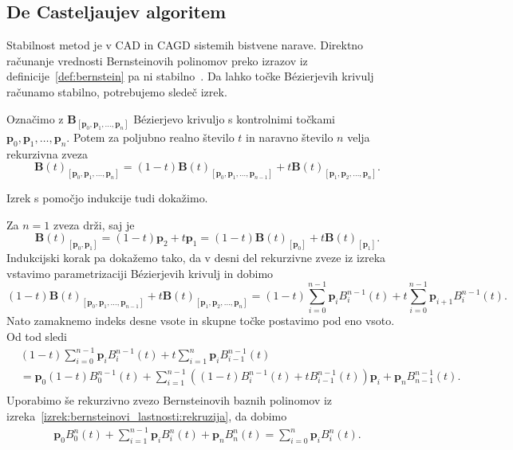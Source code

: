 \documentclass[isrm2, tisk]{fmfdelo}
\newcommand{\p}{\mathbf{p}}
\newcommand{\lilb}[2]{B_{#1}^{#2}(t)}
\newcommand{\bigbbt}{\textbf{B}(t)}
\newcommand{\bernsteinsump}[2]{\sum_{#1=0}^{#2} \p_{#1}\lilb{#1}{#2}}
\begin{document}
    \subsection{De Casteljaujev algoritem}
    Stabilnost metod je v CAD in CAGD sistemih bistvene narave.
    Direktno računanje vrednosti Bernsteinovih polinomov preko izrazov iz definicije~\ref{def:bernstein} pa ni stabilno~\cite{placeholder}.
    Da lahko točke Bézierjevih krivulj računamo stabilno, potrebujemo sledeč izrek.
    \begin{izrek}
        \label{izrek:decastelaju-rekurzija}
        Označimo z $\mathbf{B}_{[\p_0,\p_1,\dots,\p_n]}$ Bézierjevo krivuljo s kontrolnimi točkami \\
        $\p_0,\p_1,\dots,\p_n$.
        Potem za poljubno realno število $t$ in naravno število $n$ velja rekurzivna zveza \[\bigbbt_{[\p_0,\p_1,\dots,\p_n]} = (1-t)\bigbbt_{[\p_0,\p_1,\dots,\p_{n-1}]} +t\bigbbt_{[\p_1,\p_2,\dots,\p_n]}.\]
    \end{izrek}
    \noindent Izrek s pomočjo indukcije tudi dokažimo.
    \begin{dokaz}
        Za $n=1$ zveza drži, saj je  \[\bigbbt_{[\p_0,\p_1]} = (1-t)\p_2 +t\p_1 = (1-t)\bigbbt_{[\p_0]} +t\bigbbt_{[\p_1]}.\]
        Indukcijski korak pa dokažemo tako, da v desni del rekurzivne zveze iz izreka vstavimo parametrizaciji Bézierjevih krivulj in dobimo
        \[ (1-t) \bigbbt_{[\p_0,\p_1,\dots,\p_{n-1}]}+t\bigbbt_{[\p_1,\p_2,\dots,\p_n]} = (1-t)\bernsteinsump{i}{n-1}+t\sum_{i=0}^{n-1} \p_{i+1}B_i^{n-1}(t).\]
        Nato zamaknemo indeks desne vsote in skupne točke postavimo pod eno vsoto.
        Od tod sledi
        \begin{align*}
            &(1-t)\bernsteinsump{i}{n-1}+ t\sum_{i=1}^{n} \p_{i}B_{i-1}^{n-1}(t) \\
            &= \p_0(1-t)B_{0}^{n-1}(t) + \sum_{i=1}^{n-1}\left((1-t)B_i^{n-1}(t) + tB_{i-1}^{n-1}(t)\right)\p_{i} + \p_n B_{n-1}^{n-1}(t). \\
        \end{align*}
        Uporabimo še rekurzivno zvezo Bernsteinovih baznih polinomov iz izreka~\ref{izrek:bernsteinovi_lastnosti:rekruzija}, da dobimo
        \begin{align*}
            \p_0B_{0}^{n}(t) + \sum_{i=1}^{n-1}\p_{i}B_i^n(t) + \p_n B_{n}^{n}(t) = \sum_{i=0}^{n}\p_{i}B_i^n(t).
        \end{align*}
    \end{dokaz}
\end{document}
